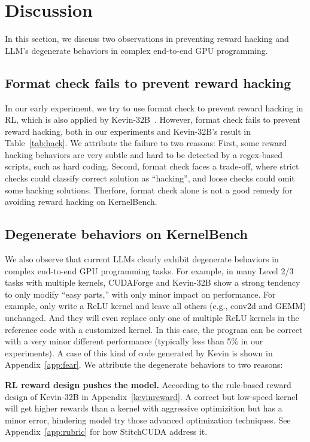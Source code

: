 \section{Discussion}
\label{sec:discuss}
In this section, we discuss two observations in preventing reward hacking and LLM's degenerate behaviors in complex end-to-end GPU programming. 

\subsection{Format check fails to prevent reward hacking}
In our early experiment, we try to use format check to prevent reward hacking in RL, which is also applied by Kevin-32B~\cite{kevin}. However, format check fails to prevent reward hacking, both in our experiments and Kevin-32B's result in Table~\ref{tab:hack}. We attribute the failure to two reasons: First, some reward hacking behaviors are very subtle and hard to be detected by a regex-based scripts, such as hard coding. Second, format check faces a trade-off, where strict checks could classify correct solution as “hacking”, and loose checks could omit some hacking solutions. Therfore, format check alone is not a good remedy for avoiding reward hacking on KernelBench. 



\subsection{Degenerate behaviors on KernelBench}
We also observe that current LLMs clearly exhibit degenerate behaviors in complex end-to-end GPU programming tasks. For example, in many Level 2/3 tasks with multiple kernels, CUDAForge and Kevin-32B show a strong tendency to only modify “easy parts,” with only minor impact on performance. For example, only write a ReLU kernel and leave all others (e.g., conv2d and GEMM) unchanged.  And they will even replace only one of multiple ReLU kernels in the reference code with a customized kernel. In this case, the program can be correct with a very minor different performance (typically less than 5\% in our experiments). A case of this kind of code generated by Kevin is shown in Appendix~\ref{app:fear}. We attribute the degenerate behaviors to two reasons:

\textbf{RL reward design pushes the model.} According to the rule-based reward design of Kevin-32B in Appendix~\ref{kevinreward}. A correct but low-speed kernel will get higher rewards than a kernel with aggressive optimizition but has a minor error, hindering model try those advanced optimization techniques. See Appendix~\ref{app:rubric} for how StitchCUDA address it.

